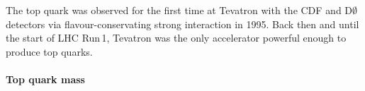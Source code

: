 The top quark was observed for the first time at Tevatron with the CDF \cite{CDF:1995wbb} and D$\emptyset$ \cite{D0:1995jca} detectors via flavour-conservating strong interaction in 1995. 
Back then and until the start of LHC Run$\,$1, Tevatron was the only accelerator powerful enough to produce top quarks. %


\paragraph{Top quark mass}\mbox{}

